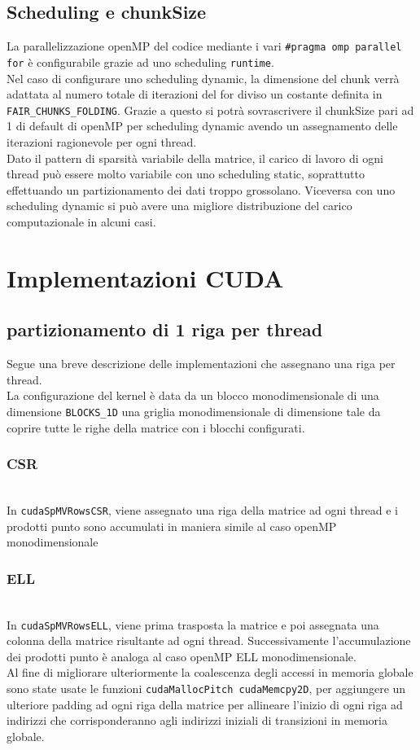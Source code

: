 \documentclass[acmsmall,nonacm=true]{acmart}
\newcommand{\vvv}[1]{{\small\texttt{#1}}}
\begin{document}
\subsection{Scheduling e chunkSize} \label{dynSchedulingFairAdapting}
La parallelizzazione openMP del codice mediante i vari \vvv{\#pragma omp parallel for} 
è configurabile grazie ad uno scheduling \vvv{runtime}.\\
Nel caso di configurare uno scheduling dynamic, la dimensione del chunk verrà 
adattata al numero totale di iterazioni del for diviso un costante definita in 
\vvv{FAIR\_CHUNKS\_FOLDING}.
Grazie a questo si potrà sovrascrivere il chunkSize pari ad 1 di default di openMP
per scheduling dynamic avendo un assegnamento delle iterazioni ragionevole per
ogni thread.\\
\label{dynSched_sparsityPattern}
Dato il pattern di sparsità variabile della matrice, il carico di lavoro di ogni
thread può essere molto variabile con uno scheduling static, 
soprattutto effettuando un partizionamento dei dati troppo grossolano. 
Viceversa con uno scheduling dynamic si può avere una migliore distribuzione del
carico computazionale in alcuni casi.

\section{Implementazioni CUDA}
\subsection{partizionamento di 1 riga per thread}
Segue una breve descrizione delle implementazioni che assegnano una riga per thread.\\
La configurazione del kernel è data da 
un blocco monodimensionale di una dimensione \vvv{BLOCKS\_1D}
una griglia monodimensionale di dimensione tale da coprire tutte le righe della matrice 
con i blocchi configurati.
\subsubsection{CSR}\hfill\\
In \vvv{cudaSpMVRowsCSR}, viene assegnato una riga della matrice ad ogni thread
e i prodotti punto sono accumulati in maniera simile al caso openMP monodimensionale
\subsubsection{ELL} \label{cudaSpMVRowsELL} \hfill\\
In \vvv{cudaSpMVRowsELL}, viene prima trasposta la matrice e poi assegnata una colonna
della matrice risultante ad ogni thread. Successivamente l'accumulazione dei prodotti 
punto è analoga al caso openMP ELL monodimensionale.\\
Al fine di migliorare ulteriormente la coalescenza degli accessi in memoria globale
sono state usate le funzioni \vvv{cudaMallocPitch cudaMemcpy2D}, per aggiungere un 
ulteriore padding ad ogni riga della matrice per allineare l'inizio di ogni riga 
ad indirizzi che corrisponderanno agli indirizzi iniziali di transizioni in 
memoria globale.
\end{document}
